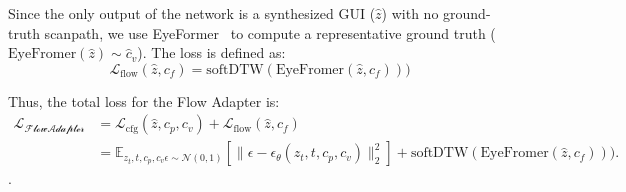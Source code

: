 Since the only output of the network is a synthesized GUI ($\hat{z}$) with no ground-truth scanpath, we use EyeFormer~\cite{eyeformer} to compute a representative ground truth ($\textrm{EyeFromer}(\hat{z}) \sim \hat{c}_v$). The loss is defined as:
\begin{equation}
    \mathcal{L}_{\textrm{flow}}(\hat{z}, c_f) = \textrm{softDTW}(\textrm{EyeFromer}(\hat{z}, c_f)))
\end{equation}

Thus, the total loss for the Flow Adapter is:
\begin{equation}
\begin{split}
  \mathcal{L_\textrm{FlowAdapter}} &=  \mathcal{L}_{\textrm{cfg}}(\hat{z}, c_p, c_v) + \mathcal{L}_{\textrm{flow}}(\hat{z}, c_f) \\
  &= \mathbb{E}_{z_t, t, c_p, c_v \epsilon \sim \mathcal{N}(0,1)} [\| \epsilon - \epsilon_{\theta}(z_t, t,c_p, c_v) \|^{2}_2] + \textrm{softDTW}(\textrm{EyeFromer}(\hat{z}, c_f))).
  \end{split}
\end{equation}.






